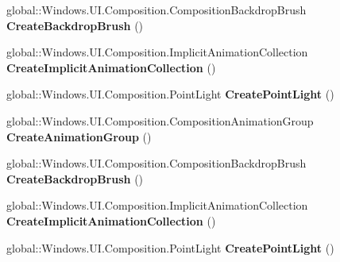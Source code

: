\begin{DoxyCompactItemize}
\item 
\mbox{\label{interface_windows_1_1_u_i_1_1_composition_1_1_i_compositor2_a61d8976607a1d3faed1024dadc930f51}} 
global\+::\+Windows.\+U\+I.\+Composition.\+Composition\+Backdrop\+Brush {\bfseries Create\+Backdrop\+Brush} ()
\item 
\mbox{\label{interface_windows_1_1_u_i_1_1_composition_1_1_i_compositor2_aac0cda04e2ab2c9d4a7a2c56f5a5cc70}} 
global\+::\+Windows.\+U\+I.\+Composition.\+Implicit\+Animation\+Collection {\bfseries Create\+Implicit\+Animation\+Collection} ()
\item 
\mbox{\label{interface_windows_1_1_u_i_1_1_composition_1_1_i_compositor2_af9017b48335a947750d1075cf206c777}} 
global\+::\+Windows.\+U\+I.\+Composition.\+Point\+Light {\bfseries Create\+Point\+Light} ()
\item 
\mbox{\label{interface_windows_1_1_u_i_1_1_composition_1_1_i_compositor2_a614654ecc2c1a3a0a9f0535586ebd659}} 
global\+::\+Windows.\+U\+I.\+Composition.\+Composition\+Animation\+Group {\bfseries Create\+Animation\+Group} ()
\item 
\mbox{\label{interface_windows_1_1_u_i_1_1_composition_1_1_i_compositor2_a61d8976607a1d3faed1024dadc930f51}} 
global\+::\+Windows.\+U\+I.\+Composition.\+Composition\+Backdrop\+Brush {\bfseries Create\+Backdrop\+Brush} ()
\item 
\mbox{\label{interface_windows_1_1_u_i_1_1_composition_1_1_i_compositor2_aac0cda04e2ab2c9d4a7a2c56f5a5cc70}} 
global\+::\+Windows.\+U\+I.\+Composition.\+Implicit\+Animation\+Collection {\bfseries Create\+Implicit\+Animation\+Collection} ()
\item 
\mbox{\label{interface_windows_1_1_u_i_1_1_composition_1_1_i_compositor2_af9017b48335a947750d1075cf206c777}} 
global\+::\+Windows.\+U\+I.\+Composition.\+Point\+Light {\bfseries Create\+Point\+Light} ()

\end{DoxyCompactItemize}
